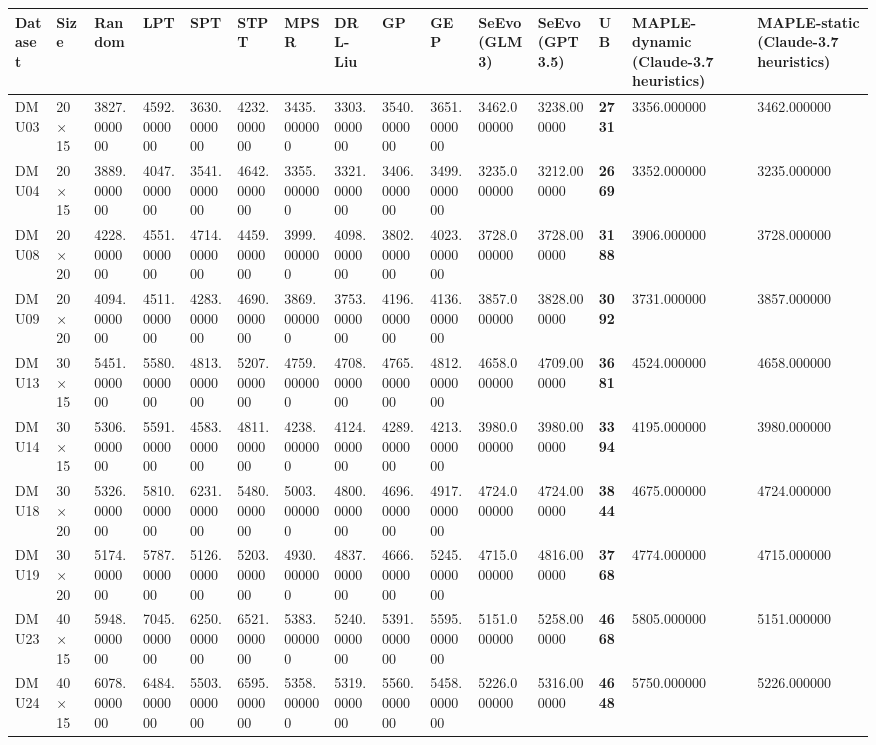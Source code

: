 \begin{tabular}{ll}
\toprule
Dataset & Size & Random & LPT & SPT & STPT & MPSR & DRL-Liu & GP & GEP & SeEvo(GLM3) & SeEvo(GPT3.5) & UB & MAPLE-dynamic (Claude-3.7 heuristics) & MAPLE-static (Claude-3.7 heuristics) \\
\midrule
DMU03 & 20 × 15 & 3827.000000 & 4592.000000 & 3630.000000 & 4232.000000 & 3435.000000 & 3303.000000 & 3540.000000 & 3651.000000 & 3462.000000 & 3238.000000 & \textbf{2731} & 3356.000000 & 3462.000000 \\
DMU04 & 20 × 15 & 3889.000000 & 4047.000000 & 3541.000000 & 4642.000000 & 3355.000000 & 3321.000000 & 3406.000000 & 3499.000000 & 3235.000000 & 3212.000000 & \textbf{2669} & 3352.000000 & 3235.000000 \\
DMU08 & 20 × 20 & 4228.000000 & 4551.000000 & 4714.000000 & 4459.000000 & 3999.000000 & 4098.000000 & 3802.000000 & 4023.000000 & 3728.000000 & 3728.000000 & \textbf{3188} & 3906.000000 & 3728.000000 \\
DMU09 & 20 × 20 & 4094.000000 & 4511.000000 & 4283.000000 & 4690.000000 & 3869.000000 & 3753.000000 & 4196.000000 & 4136.000000 & 3857.000000 & 3828.000000 & \textbf{3092} & 3731.000000 & 3857.000000 \\
DMU13 & 30 × 15 & 5451.000000 & 5580.000000 & 4813.000000 & 5207.000000 & 4759.000000 & 4708.000000 & 4765.000000 & 4812.000000 & 4658.000000 & 4709.000000 & \textbf{3681} & 4524.000000 & 4658.000000 \\
DMU14 & 30 × 15 & 5306.000000 & 5591.000000 & 4583.000000 & 4811.000000 & 4238.000000 & 4124.000000 & 4289.000000 & 4213.000000 & 3980.000000 & 3980.000000 & \textbf{3394} & 4195.000000 & 3980.000000 \\
DMU18 & 30 × 20 & 5326.000000 & 5810.000000 & 6231.000000 & 5480.000000 & 5003.000000 & 4800.000000 & 4696.000000 & 4917.000000 & 4724.000000 & 4724.000000 & \textbf{3844} & 4675.000000 & 4724.000000 \\
DMU19 & 30 × 20 & 5174.000000 & 5787.000000 & 5126.000000 & 5203.000000 & 4930.000000 & 4837.000000 & 4666.000000 & 5245.000000 & 4715.000000 & 4816.000000 & \textbf{3768} & 4774.000000 & 4715.000000 \\
DMU23 & 40 × 15 & 5948.000000 & 7045.000000 & 6250.000000 & 6521.000000 & 5383.000000 & 5240.000000 & 5391.000000 & 5595.000000 & 5151.000000 & 5258.000000 & \textbf{4668} & 5805.000000 & 5151.000000 \\
DMU24 & 40 × 15 & 6078.000000 & 6484.000000 & 5503.000000 & 6595.000000 & 5358.000000 & 5319.000000 & 5560.000000 & 5458.000000 & 5226.000000 & 5316.000000 & \textbf{4648} & 5750.000000 & 5226.000000 \\

\end{tabular}
